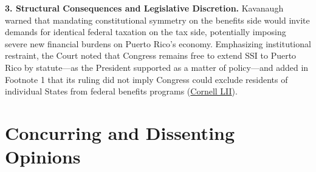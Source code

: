\documentclass[12pt]{article}
\begin{document}
\textbf{3. Structural Consequences and Legislative Discretion.} Kavanaugh warned that mandating constitutional symmetry on the benefits side would invite demands for identical federal taxation on the tax side, potentially imposing severe new financial burdens on Puerto Rico's economy. Emphasizing institutional restraint, the Court noted that Congress remains free to extend SSI to Puerto Rico by statute---as the President supported as a matter of policy---and added in Footnote 1 that its ruling did not imply Congress could exclude residents of individual States from federal benefits programs (\href{https://www.law.cornell.edu/supremecourt/text/20-303}{Cornell LII}).

\section{Concurring and Dissenting Opinions}
\end{document}
